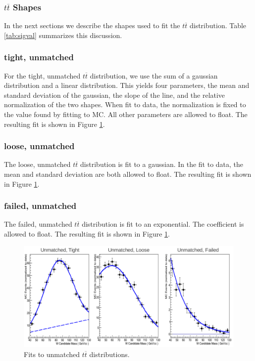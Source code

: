 \subsubsection{$t\overline{t}$ Shapes}
In the next sections we describe the shapes used to fit the $t\overline{t}$ distribution. Table \ref{tab:sigval} summarizes this discussion.
\subsubsection*{tight, unmatched}
For the tight, unmatched $t\overline{t}$ distribution, we use the sum of a gaussian distribution and a linear distribution. This yields four parameters, the mean and standard deviation of the gaussian, the slope of the line, and the relative normalization of the two shapes. When fit to data, the normalization is fixed to the value found by fitting to MC. All other parameters are allowed to float. The resulting fit is shown in Figure \ref{fig:unmatchedF}.
\subsubsection*{loose, unmatched}
The loose, unmatched $t\overline{t}$ distribution is fit to a gaussian. In the fit to data, the mean and standard deviation are both allowed to float. The resulting fit is shown in Figure \ref{fig:unmatchedF}.
\subsubsection*{failed, unmatched}
The failed, unmatched $t\overline{t}$ distribution is fit to an exponential. The coefficient is allowed to float. The resulting fit is shown in Figure \ref{fig:unmatchedF}.
\begin{figure}[h!]
\centering
\includegraphics[scale=0.5]{EXO-12-024/figs/WtagSF/unmatched_fits.png}
\caption{Fits to unmatched $t\overline{t}$ distributions.}\label{fig:unmatchedF}
\end{figure}
